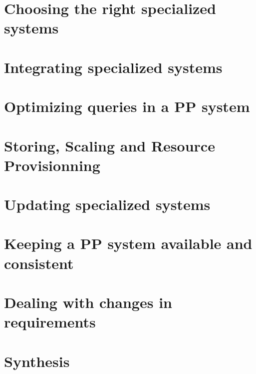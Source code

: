 \documentclass[11pt]{article}
\begin{document}
\section{Choosing the right specialized systems}



\section{Integrating specialized systems}



\section{Optimizing queries in a PP system}



\section{Storing, Scaling and Resource Provisionning}



\section{Updating specialized systems}



\section{Keeping a PP system available and consistent}



\section{Dealing with changes in requirements}



\section{Synthesis}

{}

\end{document}
